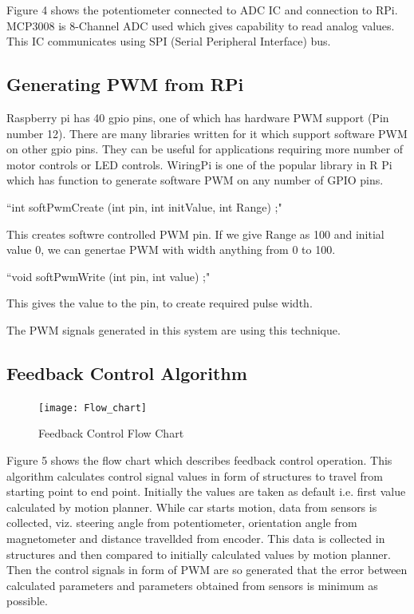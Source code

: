 \documentclass[conference]{IEEEtran}
\begin{document}
Figure 4 shows the potentiometer connected to ADC IC and connection to RPi. MCP3008 is 8-Channel ADC used which gives capability to read analog values. This IC communicates using SPI (Serial Peripheral Interface) bus. \cite{paper7}

\subsection{Generating PWM from RPi}
Raspberry pi has 40 gpio pins, one of which has hardware PWM support (Pin number 12). 
There are many libraries written for it which support software PWM on other gpio pins. 
They can be useful for applications requiring more number of motor controls or LED controls.
WiringPi is one of the popular library in R Pi which has function to generate software PWM on any number of GPIO pins.\cite{paper6}

``int softPwmCreate (int pin, int initValue, int Range) ;"

This creates softwre controlled PWM pin. If we give Range as 100 and initial value 0, we can genertae PWM with width anything from 0 to 100.

``void softPwmWrite (int pin, int value) ;"

This gives the value to the pin, to create required pulse width.

The PWM signals generated in this system are using this technique.

\subsection{Feedback Control Algorithm}

\begin{figure}[H]
	\centering
	\texttt{[image: Flow\_chart]}
	\caption{Feedback Control Flow Chart}
\end{figure}

Figure 5 shows the flow chart which describes feedback control operation. This algorithm calculates control signal values in form of structures to travel from starting point to end point. 
Initially the values are taken as default i.e. first value calculated by motion planner. While car starts motion, data from sensors is collected, viz. steering angle from potentiometer, orientation angle from magnetometer and distance travellded from encoder. This data is collected in structures and then compared to initially calculated values by motion planner. Then the control signals in form of PWM are so generated that the error between calculated parameters and parameters obtained from sensors is minimum as possible.\cite{paper4}
\end{document}
